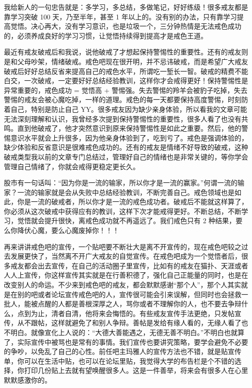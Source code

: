 \documentclass{ctexart}
\begin{document}
我给新人的一句忠告就是：多学习，多总结，多做笔记，好好练级！很多戒友都是靠学习突破 100 天，乃至半年，甚至 1 年以上的。没有别的办法，只有靠学习提高觉悟。决心再大，没有学习意识，也是垃圾一个，三分钟热情是无法戒色成功的，必须养成良好的学习习惯，让觉悟持续得到提高才是戒色王道。

最近有戒友破戒后和我说，说他破戒了才想起保持警惕性的重要性。还有的戒友则是和父母吵架，情绪破戒。戒色吧现在很开明，并不忌讳破戒，而是希望广大戒友破戒后好好总结反省来提高自己的戒色水平，所谓吃一堑长一智。破戒的精费不能白交，一次破戒，一定要好好总结经验教训，这样你才会戒得更好！保持警惕性是异常重要的，戒色成功 = 觉悟高 + 警惕强。失去警惕的羚羊会被豹子吃掉，失去警惕的戒友会被心魔吃掉，一样的道理。戒色的每一天都要保持高度警惕，时刻防着自己，特别是防止自己 YY。很多戒友因为缺少亲身体验，所以看我的文章可能无法深刻理解和认识，我曾经多次提到保持警惕性的重要性，很多人看了也没有共鸣。直到他破戒了，他才突然意识到原来保持警惕性是如此之重要。然后，他的警惕意识水平就会上升很多，因为他亲身体验到了，吃到亏了。戒色是强调体验的，缺少体验和反省意识是很难戒色成功的。还有的戒友是情绪不好导致的破戒，这种破戒类型我以前的文章专门总结过，管理好自己的情绪也是非常关键的，等你学会管理自己情绪了，你就会戒得更稳定更长久。

股市有一句话叫：“因为你是一流的输家，所以你才是一流的赢家。”何谓一流的输家？一流的输家就是会从失败中总结经验教训，不断完善自己。戒色领域也是如此，你是一流的破戒者，所以你才是一流的戒色成功者。破戒后不能就这样算了，你必须从这次破戒中获得应有的教训，这样下次才能戒得更好。不断总结，不断学习，觉悟就会提升很快，离戒色成功就不再遥远了。我们戒色只有 2 种结果，要么你降伏心魔，要么心魔废掉你！！！

再来讲讲戒色吧的宣传，一个贴吧要不断壮大是离不开宣传的，现在戒色吧较之过去发展更快了，当然离不开广大戒友的自觉宣传。在戒色吧成为一个觉悟者后，很多戒友都会出去宣传，在自己的活动圈子里宣传，比如有的戒友在猫扑、天涯或者人人上宣传，你这样宣传其实就是在行善积德了，强化自己正能量的同时，也是在改变别人的命运。不少来到戒色吧的戒友，都会默默感谢“那个人”，那个人其实就是在别的吧或者论坛宣传戒色吧的人，宣传很可能会引来误解，但同时也会拯救一批人，能被点醒的人都是善根深厚之人，骂你或者不理解你的人，也不要去争辩什么，点到为止，清者自清，他将来会悔悟的。有些戒友宣传手法更绝，只发帖宣传，从不跟帖，这样就避免了和别人争辩。善帖是发给有缘人看的，无缘人看了也不明白。就像宣化上人说的：“大德大善能遇之，无德无善不明白。”不明白也就算了，实际宣传中被骂也是常有的事情。我们宣传也要讲究策略，要学会避免不必要的争吵，以免乱了自己的心性。前任吧主玛雅人的宣传方法也不错，就是贴宣传单，你可以在生活中贴，也可以在论坛里贴，我觉得大学的布告栏是个不错的选择，你打印几份贴上去就有望唤醒很多人。这是一件善举，将来会有很多人在心里默默感激你的。
\end{document}
